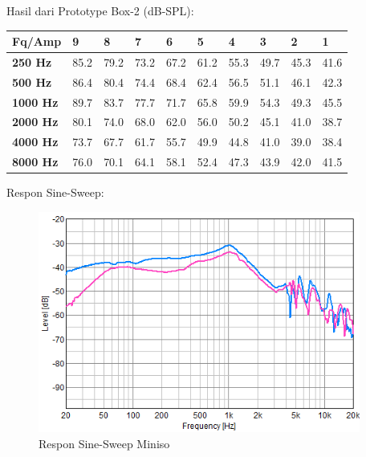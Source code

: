 \documentclass[12pt,]{article}
\begin{document}
	Hasil dari Prototype Box-2 (dB-SPL):
	
	\begin{center}
		\begin{tabular}{|l|l|l|l|l|l|l|l|l|l|}
			\hline
			\textbf{Fq/Amp}  & \textbf{9} & \textbf{8} & \textbf{7} & \textbf{6} & \textbf{5} & \textbf{4} & \textbf{3} & \textbf{2} & \textbf{1} \\ \hline
			\textbf{250 Hz}  & 85.2       & 79.2       & 73.2       & 67.2       & 61.2       & 55.3       & 49.7       & 45.3       & 41.6       \\ \hline
			\textbf{500 Hz}  & 86.4       & 80.4       & 74.4       & 68.4       & 62.4       & 56.5       & 51.1       & 46.1       & 42.3       \\ \hline
			\textbf{1000 Hz} & 89.7       & 83.7       & 77.7       & 71.7       & 65.8       & 59.9       & 54.3       & 49.3       & 45.5       \\ \hline
			\textbf{2000 Hz} & 80.1       & 74.0       & 68.0       & 62.0       & 56.0       & 50.2       & 45.1       & 41.0       & 38.7       \\ \hline
			\textbf{4000 Hz} & 73.7       & 67.7       & 61.7       & 55.7       & 49.9       & 44.8       & 41.0       & 39.0       & 38.4       \\ \hline
			\textbf{8000 Hz} & 76.0       & 70.1       & 64.1       & 58.1       & 52.4       & 47.3       & 43.9       & 42.0       & 41.5       \\ \hline
		\end{tabular}
	\end{center}
	
	Respon Sine-Sweep:
	
	\begin{figure}[!ht]
		\centering
		\includegraphics[width=300pt]{images/respon/FP-Miniso}
		\caption{Respon Sine-Sweep Miniso}
	\end{figure}
\end{document}
